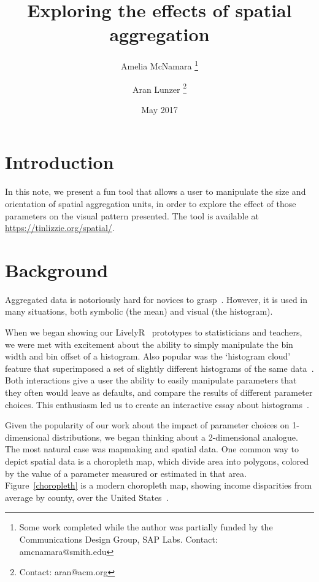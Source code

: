 \documentclass{article}\usepackage[]{graphicx}\usepackage[]{color}
\begin{document}
\title{Exploring the effects of spatial aggregation}
\author[1]{Amelia McNamara%
\thanks{Some work completed while the author was partially funded by the Communications Design Group, SAP Labs. Contact: amcnamara@smith.edu}}
\author[2]{Aran Lunzer%
\thanks{Contact: aran@acm.org}}
\date{May 2017}

\maketitle

\section{Introduction}
In this note, we present a fun tool that allows a user to manipulate the size and orientation of spatial aggregation units, in order to explore the effect of those parameters on the visual pattern presented. The tool is available at \\ \url{https://tinlizzie.org/spatial/}. 

\section{Background}
Aggregated data is notoriously hard for novices to grasp~\citep{KonHigRus2014, HanKap1992}. However, it is used in many situations, both symbolic (the mean) and visual (the histogram). 

When we began showing our LivelyR~\citep{LunMcN2014b} prototypes to statisticians and teachers, we were met with excitement about the ability to simply manipulate the bin width and bin offset of a histogram. Also popular was the `histogram cloud' feature that superimposed a set of slightly different histograms of the same data~\citep{McN2015}. Both interactions give a user the ability to easily manipulate parameters that they often would leave as defaults, and compare the results of different parameter choices. This enthusiasm led us to create an interactive essay about histograms~\citep{LunMcN2017}. 

Given the popularity of our work about the impact of parameter choices on 1-dimensional distributions, we began thinking about a 2-dimensional analogue. The most natural case was mapmaking and spatial data. One common way to depict spatial data is a choropleth map, which divide area into polygons, colored by the value of a parameter measured or estimated in that area. Figure~\ref{choropleth} is a modern choropleth map, showing income disparities from average by county, over the United States~\citep{AisBut2015}. 
\end{document}
